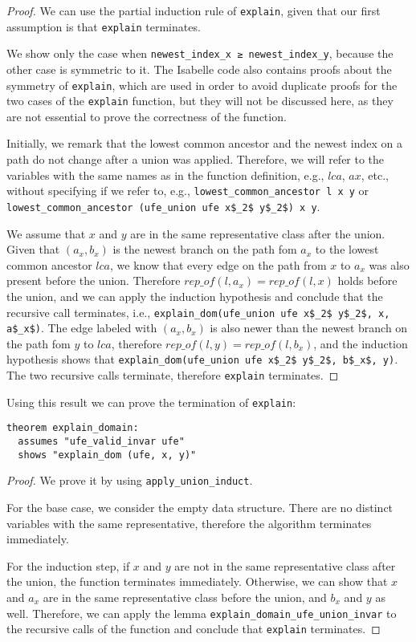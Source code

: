 \begin{proof}
We can use the partial induction rule of \lstinline|explain|, given that our first assumption is that \lstinline|explain| terminates.

We show only the case when \lstinline|newest_index_x ≥ newest_index_y|, because the other case is symmetric to it. The Isabelle code also contains proofs about the symmetry of \lstinline{explain}, which are used in order to avoid duplicate proofs for the two cases of the \lstinline{explain} function, but they will not be discussed here, as they are not essential to prove the correctness of the function.

Initially, we remark that the lowest common ancestor and the newest index on a path do not change after a union was applied. Therefore, we will refer to the variables with the same names as in the function definition, e.g., $lca$, $ax$, etc., without specifying if we refer to, e.g., \lstinline|lowest_common_ancestor l x y| or \lstinline|lowest_common_ancestor (ufe_union ufe x$_2$ y$_2$) x y|.

We assume that $x$ and $y$ are in the same representative class after the union. Given that $(a_x, b_x)$ is the newest branch on the path fom $a_x$ to the lowest common ancestor $lca$, we know that every edge on the path from $x$ to $a_x$ was also present before the union. Therefore $rep\_of(l, a_x) = rep\_of(l, x)$ holds before the union, and we can apply the induction hypothesis and conclude that the recursive call terminates, i.e., \lstinline|explain_dom(ufe_union ufe x$_2$ y$_2$, x, a$_x$)|. The edge labeled with $(a_x, b_x)$ is also newer than the newest branch on the path fom $y$ to $lca$, therefore $rep\_of(l, y) = rep\_of(l, b_x)$, and the induction hypothesis shows that \lstinline|explain_dom(ufe_union ufe x$_2$ y$_2$, b$_x$, y)|. The two recursive calls terminate, therefore \lstinline|explain| terminates.
\end{proof}

Using this result we can prove the termination of \lstinline|explain|:

\begin{lstlisting}
theorem explain_domain:
  assumes "ufe_valid_invar ufe"
  shows "explain_dom (ufe, x, y)"
\end{lstlisting}

\begin{proof}
We prove it by using \lstinline|apply_union_induct|.

For the base case, we consider the empty data structure. There are no distinct variables with the same representative, therefore the algorithm terminates immediately.

For the induction step, if $x$ and $y$ are not in the same representative class after the union, the function terminates immediately. Otherwise, we can show that $x$ and $a_x$ are in the same representative class before the union, and $b_x$ and $y$ as well. Therefore, we can apply the lemma \lstinline|explain_domain_ufe_union_invar| to the recursive calls of the function and conclude that \lstinline|explain| terminates.
\end{proof}

